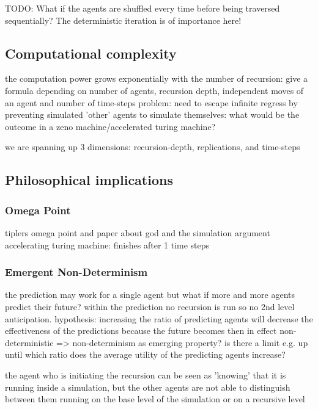 TODO: What if the agents are shuffled every time before being traversed sequentially? The deterministic iteration is of importance here!

\subsection{Computational complexity}
the computation power grows exponentially with the number of recursion: give a formula depending on number of agents, recursion depth, independent moves of an agent and number of time-steps 
problem: need to escape infinite regress by preventing simulated 'other' agents to simulate themselves: what would be the outcome in a zeno machine/accelerated turing machine?

we are spanning up 3 dimensions: recursion-depth, replications, and time-steps

\subsection{Philosophical implications}

\subsubsection{Omega Point}
tiplers omega point and paper about god and the simulation argument
accelerating turing machine: finishes after 1 time steps

\subsubsection{Emergent Non-Determinism}
the prediction may work for a single agent but what if more and more agents predict their future? within the prediction no recursion is run so no 2nd level anticipation. 
hypothesis: increasing the ratio of predicting agents will decrease the effectiveness of the predictions because the future becomes then in effect non-deterministic => non-determinism as emerging property? is there a limit e.g. up until which ratio does the average utility of the predicting agents increase?

the agent who is initiating the recursion can be seen as 'knowing' that it is running inside a simulation, but the other agents are not able to distinguish between them running on the base level of the simulation or on a recursive level

